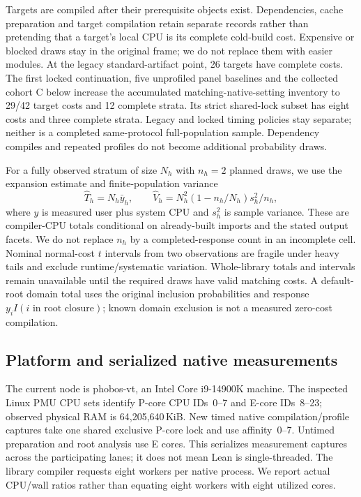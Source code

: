 \documentclass[10pt,twocolumn]{article}
\begin{document}
Targets are compiled after their prerequisite objects exist.
Dependencies, cache preparation and target compilation retain separate
records rather than pretending that a target's local CPU is its complete
cold-build cost. Expensive or blocked draws stay in the original frame;
we do not replace them with easier modules.
At the legacy standard-artifact point, 26 targets have complete costs.
The first locked continuation, five unprofiled panel baselines and the
collected cohort C below increase the accumulated matching-native-setting
inventory to 29/42 target costs and 12 complete strata.
Its strict shared-lock subset has eight costs and three complete strata.
Legacy and locked timing policies stay separate; neither is a completed
same-protocol full-population sample. Dependency compiles and repeated
profiles do not become additional probability draws.

For a fully observed stratum of size $N_h$ with $n_h=2$ planned draws,
we use the expansion estimate and finite-population variance
\[
 \widehat T_h=N_h\bar y_h,\qquad
 \widehat V_h=N_h^2(1-n_h/N_h)s_h^2/n_h ,
\]
where $y$ is measured user plus system CPU and $s_h^2$ is sample variance.
These are compiler-CPU totals conditional on already-built imports and
the stated output facets. We do not replace $n_h$ by a completed-response
count in an incomplete cell.
Nominal normal-cost $t$ intervals from two observations are fragile under
heavy tails and exclude runtime/systematic variation.
Whole-library totals and intervals remain unavailable until the required
draws have valid matching costs.
A default-root domain total uses the original inclusion probabilities and
response $y_i I(i\text{ in root closure})$; known domain exclusion is not a
measured zero-cost compilation.

\subsection{Platform and serialized native measurements}
The current node is phobos-vt, an Intel Core i9-14900K machine.
The inspected Linux PMU CPU sets identify P-core CPU IDs~0--7 and
E-core IDs~8--23; observed physical RAM is 64,205,640\,KiB.
New timed native compilation/profile captures take one shared exclusive
P-core lock and use affinity~0--7. Untimed preparation and root analysis
use E cores. This serializes measurement captures across the participating
lanes; it does not mean Lean is single-threaded.
The library compiler requests eight workers per native process.
We report actual CPU/wall ratios rather than equating eight workers with
eight utilized cores.
\end{document}
